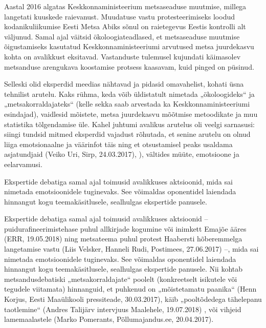 \documentclass[estonian,]{article}
\begin{document}
\begin{casebox}
Aastal 2016 algatas Keskkonnaministeerium metsaseaduse muutmise, millega
langetati kuuskede raievanust. Muudatuse vastu protesteerimiseks loodud
kodanikuliikumise Eesti Metsa Abiks sõnul on raietegevus Eestis
kontrolli alt väljunud. Samal ajal väitsid ökoloogiateadlased, et
metsaseaduse muutmise õigustamiseks kasutatud Keskkonnaministeeriumi
arvutused metsa juurdekasvu kohta on avalikkust eksitavad. Vastanduste
tulemusel kujundati käimasolev metsanduse arengukava koostamise protsess
kaasavam, kuid pinged on püsinud.
\end{casebox}

Selleski olid eksperdid meedias nähtavad ja pidasid omavahelist, kohati üsna tehnilist arutelu. Kaks rühma, keda võib üldistatult nimetada „ökoloogideks`` ja „metsakorraldajateks`` (kelle sekka saab arvestada ka Keskkonnaministeeriumi esindajad), vaidlesid mõistete, metsa juurdekasvu mõõtmise metoodikate ja muu statistika tõlgendamise üle. Kahel juhtumi avalikus arutelus oli veelgi sarnasusi: siingi tundsid mitmed eksperdid vajadust rõhutada, et senine arutelu on olnud liiga emotsionaalne ja väärinfot täis ning et otsustamisel peaks usaldama asjatundjaid (Veiko Uri, Sirp, 24.03.2017), ), vältides müüte, emotsioone ja eelarvamusi.

\begin{blockquote-right}
Ekspertide debatiga samal ajal toimusid avalikkuses aktsioonid, mida sai
nimetada emotsioonidele tuginevaks. See võimaldas oponentidel laiendada
hinnangut kogu teemakäsitlusele, sealhulgas ekspertide panusele.
\end{blockquote-right}

Ekspertide debatiga samal ajal toimusid avalikkuses aktsioonid -- puidurafineerimistehase puhul allkirjade kogumine või inimkett Emajõe ääres (ERR, 19.05.2018) ning metsateema puhul protest Haabersti hõberemmelga langetamise vastu (Liis Velsker, Hanneli Rudi, Postimees, 27.06.2017) --, mida sai nimetada emotsioonidele tuginevaks. See võimaldas oponentidel laiendada hinnangut kogu teemakäsitlusele, sealhulgas ekspertide panusele. Nii kohtab metsandusdebatiski „metsakorraldajate`` poolelt (konkreetselt isikutele või tegudele viitamata) hinnanguid, et puhkenud on „mõistetamatu paanika`` (Henn Korjus, Eesti Maaülikooli pressiteade, 30.03.2017), käib „pooltõdedega tähelepanu taotlemine`` (Andres Talijärv intervjuus Maalehele, 19.07.2018) , või vihjeid lamemaalastele (Marko Pomerants, Põllumajandus.ee, 20.04.2017).
\end{document}
